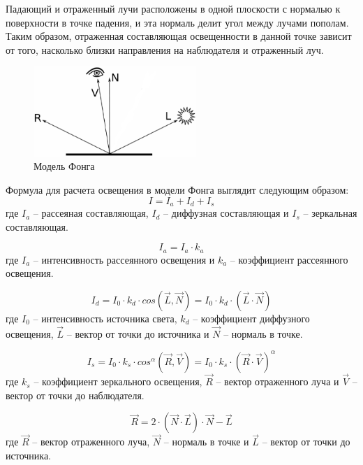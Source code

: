 Падающий и отраженный лучи расположены в одной плоскости с нормалью к поверхности в точке падения, и эта нормаль делит угол между лучами пополам. Таким образом, отраженная составляющая освещенности в данной точке зависит от того, насколько близки направления на наблюдателя и отраженный луч.
\begin{figure}[h] 
	\centering
	\includegraphics[width=0.55\textwidth]{images/phong.png}
	\caption{Модель Фонга} 
	\label{fig:phong} 
\end{figure}

Формула для расчета освещения в модели Фонга выглядит следующим образом:
\begin{equation}
	I = I_a + I_d + I_s
\end{equation}
где $I_a$ -- рассеяная составляющая, $I_d$ -- диффузная составляющая и $I_s$ -- зеркальная составляющая.

\begin{equation}
	I_a = I_a \cdot k_a
\end{equation}
где $I_a$ -- интенсивность рассеянного освещения и $k_a$ -- коэффициент рассеянного освещения.

\begin{equation}
	I_d = I_0 \cdot k_d \cdot cos(\vec{L}, \vec{N}) = I_0 \cdot k_d \cdot (\vec{L} \cdot \vec{N})
\end{equation}
где $I_0$ -- интенсивность источника света, $k_d$ -- коэффициент диффузного освещения, $\vec{L}$ -- вектор от точки до источника и $\vec{N}$ -- нормаль в точке.

\begin{equation}
	I_s = I_0 \cdot k_s \cdot cos^{\alpha}(\vec{R}, \vec{V}) = I_0 \cdot k_s \cdot (\vec{R} \cdot \vec{V})^{\alpha}
	\label{eq:specular}
\end{equation}
где $k_s$ -- коэффициент зеркального освещения, $\vec{R}$ -- вектор отраженного луча и $\vec{V}$ -- вектор от точки до наблюдателя.

\begin{equation}
	\vec{R} = 2 \cdot (\vec{N} \cdot \vec{L}) \cdot \vec{N} - \vec{L}
\end{equation}
где $\vec{R}$ -- вектор отраженного луча, $\vec{N}$ -- нормаль в точке и $\vec{L}$ -- вектор от точки до источника.

